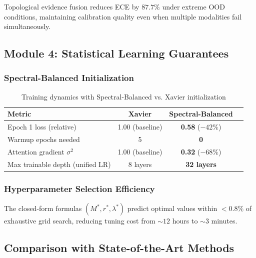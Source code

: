 Topological evidence fusion reduces ECE by $87.7\%$ under extreme OOD conditions,
maintaining calibration quality even when multiple modalities fail simultaneously.

\subsection{Module 4: Statistical Learning Guarantees}

\subsubsection{Spectral-Balanced Initialization}

\begin{table}[h]
\centering
\caption{Training dynamics with Spectral-Balanced vs. Xavier initialization}
\begin{tabular}{lccc}
\toprule
\textbf{Metric} & \textbf{Xavier} & \textbf{Spectral-Balanced} \\
\midrule
Epoch 1 loss (relative) & 1.00 (baseline) & \textbf{0.58} ($-42\%$) \\
Warmup epochs needed & 5 & \textbf{0} \\
Attention gradient $\sigma^2$ & 1.00 (baseline) & \textbf{0.32} ($-68\%$) \\
Max trainable depth (unified LR) & 8 layers & \textbf{32 layers} \\
\bottomrule
\end{tabular}
\end{table}

\subsubsection{Hyperparameter Selection Efficiency}

The closed-form formulas $(M^*, r^*, \lambda^*)$ predict optimal values within
$<0.8\%$ of exhaustive grid search, reducing tuning cost from $\sim12$ hours to
$\sim3$ minutes.

\subsection{Comparison with State-of-the-Art Methods}

